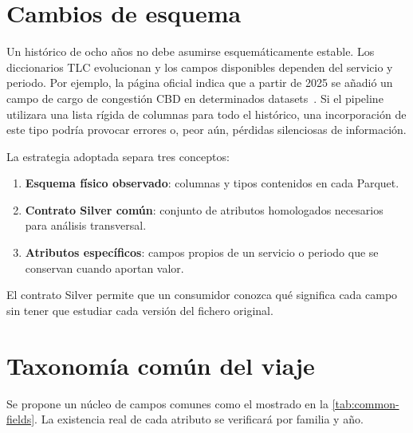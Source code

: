 \section{Cambios de esquema}

Un histórico de ocho años no debe asumirse esquemáticamente estable. Los diccionarios TLC evolucionan y los campos disponibles dependen del servicio y periodo. Por ejemplo, la página oficial indica que a partir de 2025 se añadió un campo de cargo de congestión CBD en determinados datasets~\cite{nyctlc_tripdata}. Si el pipeline utilizara una lista rígida de columnas para todo el histórico, una incorporación de este tipo podría provocar errores o, peor aún, pérdidas silenciosas de información.

La estrategia adoptada separa tres conceptos:

\begin{enumerate}
\item \textbf{Esquema físico observado}: columnas y tipos contenidos en cada Parquet.
\item \textbf{Contrato Silver común}: conjunto de atributos homologados necesarios para análisis transversal.
\item \textbf{Atributos específicos}: campos propios de un servicio o periodo que se conservan cuando aportan valor.
\end{enumerate}

El contrato Silver permite que un consumidor conozca qué significa cada campo sin tener que estudiar cada versión del fichero original.

\section{Taxonomía común del viaje}

Se propone un núcleo de campos comunes como el mostrado en la \cref{tab:common-fields}. La existencia real de cada atributo se verificará por familia y año.

